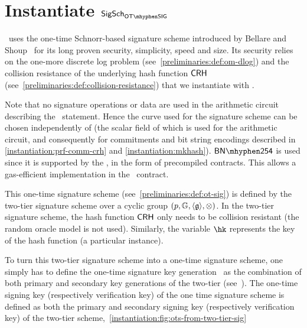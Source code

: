 
\section{Instantiate $\sigscheme_{\otsig}$}\label{instantiation:otsig}

\zeth~uses the one-time Schnorr-based signature scheme introduced by Bellare and Shoup~\cite{bellare2007two} for its long proven security, simplicity, speed and size. Its security relies on the one-more discrete log problem (see~\cref{preliminaries:def:om-dlog}) and the collision resistance of the underlying hash function $\mathsf{CRH}$ (see~\cref{preliminaries:def:collision-resistance}) that we instantiate with .

Note that no signature operations or data are used in the arithmetic circuit describing the \zeth~statement. Hence the curve used for the signature scheme can be chosen independently of \Curve (the scalar field of which is used for the arithmetic circuit, and consequently for commitments and bit string encodings described in \cref{instantiation:prf-comm-crh} and \cref{instantiation:mkhash}). $\BNCurve$ is used since it is supported by the \evm, in the form of precompiled contracts. This allows a gas-efficient implementation in the \mixer~contract.

This one-time signature scheme (see~\cref{preliminaries:def:ot-sig}) is defined by the two-tier signature scheme over a cyclic group $(p, \mathbb{G}, \langle \mathfrak{g} \rangle, \otimes)$.
In the two-tier signature scheme, the hash function $\mathsf{CRH}$ only needs to be collision resistant (the random oracle model is not used). Similarly, the variable $\hk$ represents the key of the hash function (a particular instance).

To turn this two-tier signature scheme into a one-time signature scheme, one simply has to define the one-time signature key generation \kgen~as the combination of both primary and secondary key generations of the two-tier (see~\cite[Section 6]{bellare2007two}). The one-time signing key (respectively verification key) of the one time signature scheme is defined as both the primary and secondary signing key (respectively verification key) of the two-tier scheme,~\cref{instantiation:fig:ots-from-two-tier-sig}

\newcommand{\ppk}{\ensuremath{\varstyle{ppk}}\xspace}
\newcommand{\psk}{\ensuremath{\varstyle{psk}}\xspace}
\newcommand{\spk}{\ensuremath{\varstyle{spk}}\xspace}
\newcommand{\ssk}{\ensuremath{\varstyle{ssk}}\xspace}

